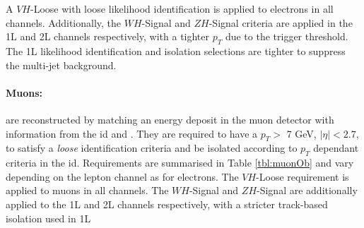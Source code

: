 A $VH$-Loose with loose likelihood identification is applied to electrons in all channels. Additionally, the $WH$-Signal and $ZH$-Signal criteria are applied in the 1L and 2L channels respectively, with a tighter $p_T$ due to the trigger threshold. The 1L likelihood identification and isolation selections are tighter to suppress the multi-jet background.

\paragraph{Muons:} are reconstructed by matching an energy deposit in the muon detector with information from the \gls{id} and  \cite{Aad:2746302}. They are required to have a $p_T >$ 7 GeV, $|\eta| < 2.7$, to satisfy a \textit{loose} identification criteria and be isolated according to $p_T$ dependant criteria in the \gls{id}. Requirements are summarised in Table \ref{tbl:muonOb} and vary depending on the lepton channel as for electrons. The $VH$-Loose requirement is applied to muons in all channels. The $WH$-Signal and $ZH$-Signal are additionally applied to the 1L and 2L channels respectively, with a stricter track-based isolation used in 1L 

\begin{table}[!htbp]
    \begin{center}
      \caption{Muon Selection requirements.}
      \label{tbl:muonOb}
    \end{center}
  \end{table}
  
